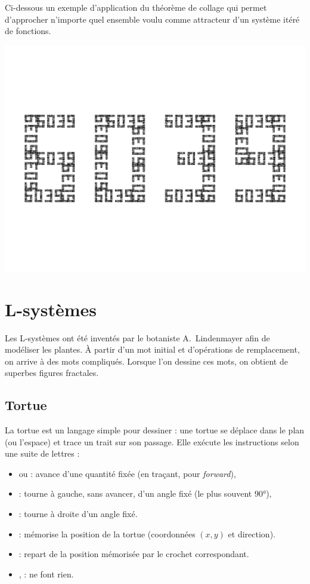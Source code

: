 \documentclass[11pt,class=report,crop=false]{standalone}
\begin{document}
Ci-dessous un exemple d'application du \og{}théorème de collage\fg{} qui permet d'approcher n'importe quel ensemble voulu comme attracteur d'un système itéré de fonctions.
\begin{center}
\includegraphics[scale=\myscale,scale=0.6]{figures/ifs-07}
\end{center}


\section{L-systèmes}


Les L-systèmes ont été inventés par le botaniste A.~Lindenmayer afin de modéliser les plantes. 
À partir d'un mot initial et d'opérations de remplacement, on arrive à des mots compliqués. Lorsque l'on \og{}dessine\fg{} ces mots, on obtient de superbes figures fractales.


\subsection{Tortue}

La \og{}tortue\fg{} est un langage simple pour dessiner : une tortue se déplace dans le plan (ou l'espace) et trace un trait sur son passage. Elle exécute les instructions selon une suite de lettres :


\begin{itemize}
  \item {} ou  : avance d'une quantité fixée (en traçant,  pour \emph{forward}),
  \item \mot{+} : tourne à gauche, sans avancer, d'un angle fixé (le plus souvent $\ang{90}$),
  \item \mot{-} : tourne à droite d'un angle fixé.
  \item \mot{[} : mémorise la position de la tortue (coordonnées $(x,y)$ et direction).
  \item \mot{]} : repart de la position mémorisée par le crochet \mot{[} correspondant.
  \item {},  : ne font rien. 
\end{itemize}
\end{document}
